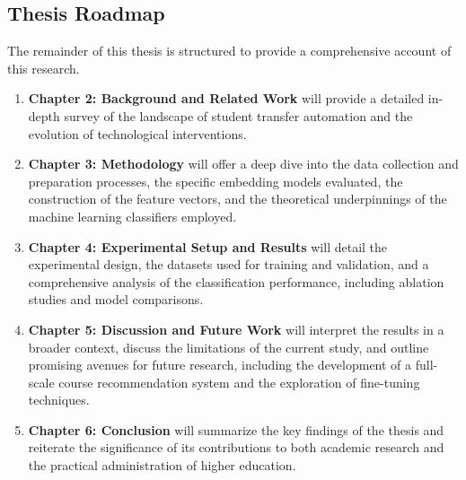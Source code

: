 \subsection{Thesis Roadmap}
The remainder of this thesis is structured to provide a comprehensive account of this research.
\begin{enumerate}
\item \textbf{Chapter 2: Background and Related Work} will provide a detailed in-depth survey of the landscape of student transfer automation and the evolution of technological interventions.
\item \textbf{Chapter 3: Methodology} will offer a deep dive into the data collection and preparation processes, the specific embedding models evaluated, the construction of the feature vectors, and the theoretical underpinnings of the machine learning classifiers employed.
\item \textbf{Chapter 4: Experimental Setup and Results} will detail the experimental design, the datasets used for training and validation, and a comprehensive analysis of the classification performance, including ablation studies and model comparisons.
\item \textbf{Chapter 5: Discussion and Future Work} will interpret the results in a broader context, discuss the limitations of the current study, and outline promising avenues for future research, including the development of a full-scale course recommendation system and the exploration of fine-tuning techniques.
\item \textbf{Chapter 6: Conclusion} will summarize the key findings of the thesis and reiterate the significance of its contributions to both academic research and the practical administration of higher education.
\end{enumerate}